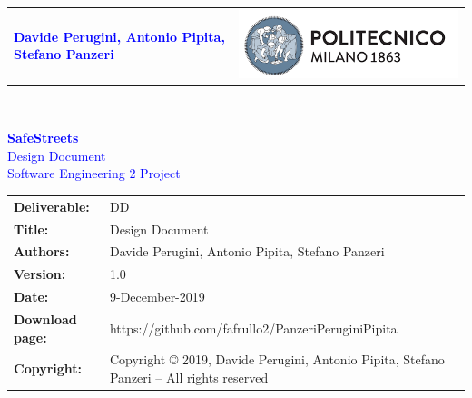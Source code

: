




\begin{titlepage}



{\begin{table}[t!]
\centering
\begin{tabu} to \textwidth { X[1.3,r,p] X[1.7,l,p] }
\textcolor{Blue}
{\textbf{\small{Davide Perugini, Antonio Pipita, Stefano Panzeri}}} & \includegraphics[scale=0.5]{Images/PolimiLogo}
\end{tabu}
\end{table}}~\\ [7cm]


\begin{flushleft}

{\textcolor{Blue}{\textbf{\Huge{SafeStreets}} \linebreak \\ 
		Design Document \\
		Software Engineering 2 Project}} \\ [1cm]
		

\end{flushleft}

\end{titlepage}

\begin{table}[h!]
\begin{tabu} to \textwidth { X[0.3,r,p] X[0.7,l,p] }
\hline

\textbf{Deliverable:} & DD\\
\textbf{Title:} & Design Document \\
\textbf{Authors:} & Davide Perugini, Antonio Pipita, Stefano Panzeri\\
\textbf{Version:} & 1.0 \\ 
\textbf{Date:} & 9-December-2019 \\
\textbf{Download page:} & https://github.com/fafrullo2/PanzeriPeruginiPipita \\
\textbf{Copyright:} & Copyright © 2019, Davide Perugini, Antonio Pipita, Stefano Panzeri – All rights reserved \\
\hline
\end{tabu}
\end{table}




